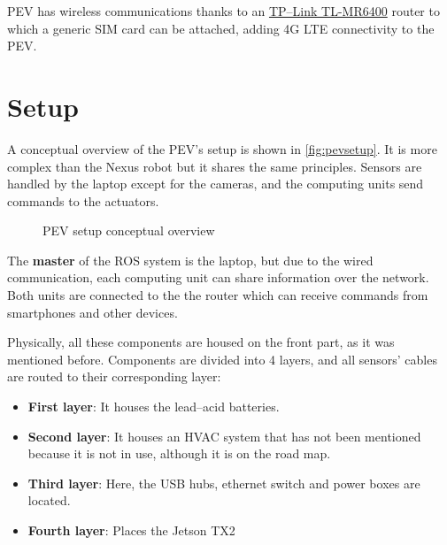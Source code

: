  PEV has wireless communications thanks to an \href{https://www.tp-link.com/la/products/details/cat-4691_TL-MR6400.html}{TP--Link TL-MR6400} router to which a generic SIM card can be attached, adding 4G LTE connectivity to the PEV.

\section{Setup}

A conceptual overview of the PEV's setup is shown in \autoref{fig:pevsetup}. It is more complex than the Nexus robot but it shares the same principles. Sensors are handled by the laptop except for the cameras, and the computing units send commands to the actuators. 
\begin{figure}[t!]
  \centering
  \caption{PEV setup conceptual overview}
  \label{fig:pevsetup}
\end{figure}

\clearpage
The \textbf{master} of the ROS system is the laptop, but due to the wired communication, each computing unit can share information over the network. Both units are connected to the the router which can receive commands from smartphones and other devices.

Physically, all these components are housed on the front part, as it was mentioned before. Components are divided into 4 layers, and all sensors' cables are routed to their corresponding layer:
\begin{itemize}
  \item \textbf{First layer}: It houses the lead--acid batteries.

  \item \textbf{Second layer}: It houses an HVAC system that has not been mentioned because it is not in use, although it is on the road map.

  \item \textbf{Third layer}: Here, the USB hubs, ethernet switch and power boxes are located.

  \item \textbf{Fourth layer}: Places the Jetson TX2
\end{itemize}

